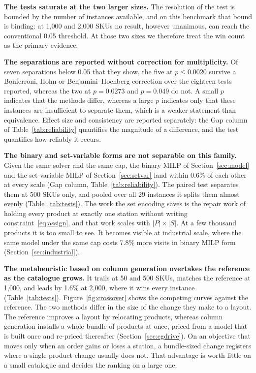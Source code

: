 \documentclass[]{interact}
\begin{document}
\textbf{The tests saturate at the two larger sizes.} The resolution of the test is bounded by the number of instances available, and on this benchmark that bound is binding: at 1{,}000 and 2{,}000 SKUs no result, however unanimous, can reach the conventional 0.05 threshold. At those two sizes we therefore treat the win count as the primary evidence.

\textbf{The separations are reported without correction for multiplicity.} Of seven separations below 0.05 that they show, the five at $p \le 0.0020$ survive a Bonferroni, Holm or Benjamini--Hochberg correction over the eighteen tests reported, whereas the two at $p = 0.0273$ and $p = 0.049$ do not. A small $p$ indicates that the methods differ, whereas a large $p$ indicates only that these instances are insufficient to separate them, which is a weaker statement than equivalence. Effect size and consistency are reported separately: the Gap column of Table~\ref{tab:reliability} quantifies the magnitude of a difference, and the test quantifies how reliably it recurs.

\textbf{The binary and set-variable forms are not separable on this family.} Given the same solver and the same cap, the binary MILP of Section~\ref{sec:model} and the set-variable MILP of Section~\ref{sec:setvar} land within 0.6\% of each other at every scale (Gap column, Table~\ref{tab:reliability}). The paired test separates them at 500 SKUs only, and pooled over all 29 instances it splits them almost evenly (Table~\ref{tab:tests}). The work the set encoding saves is the repair work of holding every product at exactly one station without writing constraint~\eqref{eq:assign}, and that work scales with $|P| \times |S|$. At a few thousand products it is too small to see. It becomes visible at industrial scale, where the same model under the same cap costs 7.8\% more visits in binary MILP form (Section~\ref{sec:industrial}).

\textbf{The metaheuristic based on column generation overtakes the reference as the catalogue grows.}  It trails at 50 and 500 SKUs, matches the reference at 1,000, and leads by 1.6\% at 2,000, where it wins every instance (Table~\ref{tab:tests}). Figure~\ref{fig:crossover} shows the competing curves against the reference. The two methods differ in the size of the change they make to a layout. The reference improves a layout by relocating products, whereas column generation installs a whole bundle of products at once, priced from a model that is built once and re-priced thereafter (Section~\ref{sec:cgdrive}). On an objective that moves only when an order gains or loses a station, a bundle-sized change registers where a single-product change usually does not. That advantage is worth little on a small catalogue and decides the ranking on a large one.
\end{document}
